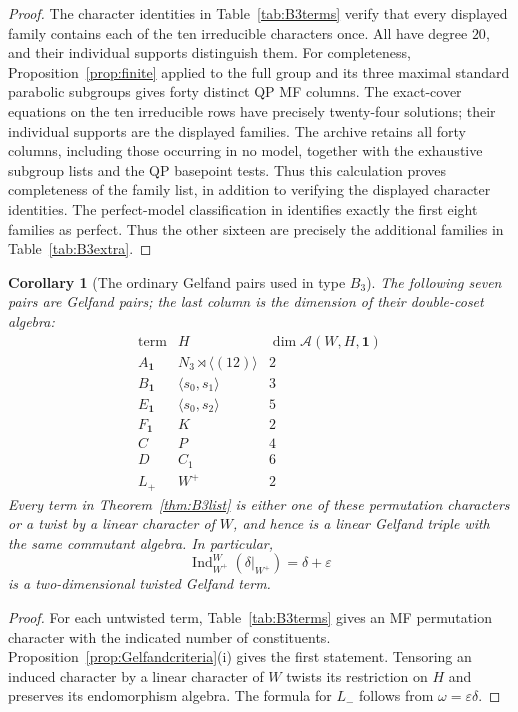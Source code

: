 \documentclass[11pt]{article}
\numberwithin{equation}{section}
\newtheorem{corollary}[theorem]{Corollary}
\theoremstyle{definition}
\DeclareMathOperator{\Ind}{Ind}
\newcommand{\ee}{\varepsilon}
\newcommand{\dd}{\delta}
\newcommand{\om}{\omega}
\newcommand{\one}{\mathbf 1}
\begin{document}
\begin{proof}
The character identities in Table~\ref{tab:B3terms} verify that every displayed family contains each of the ten irreducible characters once.
All have degree \(20\), and their individual supports distinguish them.
For completeness, Proposition~\ref{prop:finite} applied to the full group and its three maximal standard parabolic subgroups gives forty distinct QP MF columns.
The exact-cover equations on the ten irreducible rows have precisely twenty-four solutions; their individual supports are the displayed families.
The archive \cite{ZhangData} retains all forty columns, including those occurring in no model, together with the exhaustive subgroup lists and the QP basepoint tests.
Thus this calculation proves completeness of the family list, in addition to verifying the displayed character identities.
The perfect-model classification in \cite{MZperfect} identifies exactly the first eight families as perfect.
Thus the other sixteen are precisely the additional families in Table~\ref{tab:B3extra}.
\end{proof}

\begin{corollary}[The ordinary Gelfand pairs used in type \(B_3\)]
\label{cor:B3Gelfand}
The following seven pairs are Gelfand pairs; the last column is the
dimension of their double-coset algebra:
\[
\begin{array}{c|c|c}
\text{term}&H&\dim\mathscr A(W,H,\one)\\ \hline
A_\one&N_3\rtimes\langle(12)\rangle&2\\
B_\one&\langle s_0,s_1\rangle&3\\
E_\one&\langle s_0,s_2\rangle&5\\
F_\one&K&2\\
C&P&4\\
D&C_1&6\\
L_+&W^+&2
\end{array}
\]
Every term in Theorem~\ref{thm:B3list} is either one of these
permutation characters or a twist by a linear character of \(W\), and
hence is a linear Gelfand triple with the same commutant algebra.
In particular,
\[
 \Ind_{W^+}^{W}(\dd|_{W^+})=\dd+\ee
\]
is a two-dimensional twisted Gelfand term.
\end{corollary}
\begin{proof}
For each untwisted term, Table~\ref{tab:B3terms} gives an MF
permutation character with the indicated number of constituents.
Proposition~\ref{prop:Gelfandcriteria}(i) gives the first statement.
Tensoring an induced character by a linear character of \(W\) twists
its restriction on \(H\) and preserves its endomorphism algebra.
The formula for \(L_-\) follows from \(\om=\ee\dd\).
\end{proof}
\end{document}
